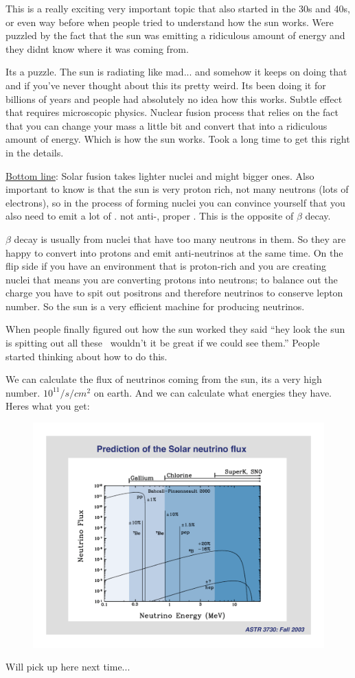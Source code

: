 {This is a really exciting very important topic that also started in the 30s and 40s, or even way before when people tried to understand how the sun works.
Were puzzled by the fact that the sun was emitting a ridiculous amount of energy and they didnt know where it was coming from. 

Its a puzzle. 
The sun is radiating like mad... and somehow it keeps on doing that and if you've never thought about this its pretty weird. 
Its been doing it for billions of years and people had absolutely no idea how this works.  
Subtle effect that requires microscopic physics.  
Nuclear fusion process that relies on the fact that you can change your mass a little bit and convert that into a ridiculous amount of energy.
Which is how the sun works. 
Took a long time to get this right in the details. 


\underline{Bottom line}: Solar fusion takes lighter nuclei and might bigger ones.
Also important to know is that the sun is very proton rich, not many neutrons (lots of electrons), so in the process of forming nuclei you can convince yourself that you also need to emit a lot of \nus. 
not anti-\nus, proper \nus.   
This is the opposite of $\beta$ decay. 

$\beta$ decay is usually from nuclei that have too many neutrons in them. 
So they are happy to convert into protons and emit anti-neutrinos at the same time. 
On the flip side if you have an environment that is proton-rich and you are creating nuclei that means you are converting protons into neutrons; to balance out the charge you have to spit out positrons and therefore neutrinos to conserve lepton number. 
So the sun is a very efficient machine for producing neutrinos. 

When people finally figured out how the sun worked they said ``hey look the sun is spitting out all these \nus\ wouldn't it be great if we could see them.''
People started thinking about how to do this. 

We can calculate the flux of neutrinos coming from the sun,  its a very high number. $10^{11}/s/cm^2$ on earth. 
And we can calculate what energies they have.  
Heres what you get:

\begin{figure}[h!]
\centering
\includegraphics[width=1.0\textwidth]{./NuFromSun.pdf}
\end{figure}

Will pick up here next time...



}



